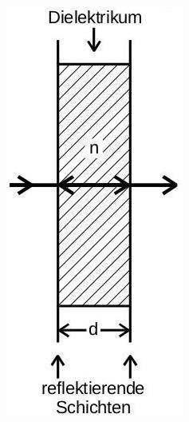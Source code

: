 \begin{figure}[H]
\begin{figure}
    \centering
    \begin{subfigure}[c]{0.19\textwidth}
        \includegraphics[width=\textwidth]{filter.jpg}

\end{subfigure}
\end{figure}
\end{figure}
